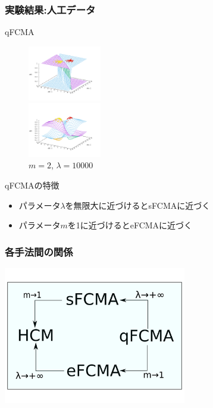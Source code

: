 \documentclass[13pt,dvipdfmx]{beamer}
\begin{document}
\begin{frame}\frametitle{実験結果:人工データ}
  \begin{block}{qFCMA}
    \begin{figure}[htbp]
      \begin{minipage}{0.4\hsize}
        \begin{center}
          \includegraphics[width=32mm]{qFCMA-Em11-Lambda10.png}
        \end{center}
        \captionsetup{labelformat=empty,labelsep=none}
        \caption{$m=1.01$\;, \;$\lambda=10$}
        \label{fig:one}
      \end{minipage}
      \begin{minipage}{0.4\hsize}
        \begin{center}
          \includegraphics[width=32mm]{qFCMA-Em2-Lambda10000.png}
        \end{center}
        \captionsetup{labelformat=empty,labelsep=none}
        \caption{$m=2$\;, \;$\lambda=10000$}
        \label{fig:two}
      \end{minipage}
    \end{figure}
  \end{block}
  \begin{block}{qFCMAの特徴}
    \begin{itemize}
      \item パラメータ$\lambda$を無限大に近づけるとsFCMAに近づく
      \item パラメータ$m$を1に近づけるとeFCMAに近づく
    \end{itemize}
  \end{block}
\end{frame}

\begin{frame}\frametitle{各手法間の関係}
  \begin{center}
    \includegraphics[height=60mm]{method.png}
  \end{center}
\end{frame}
\end{document}
